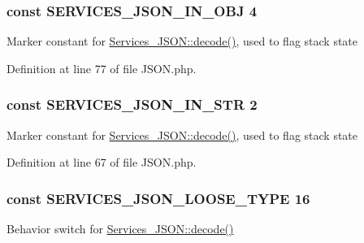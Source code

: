 \hypertarget{_j_s_o_n_8php_a3c58eb6f6956ee76d47965de616827a3}{
\subsubsection[{S\+E\+R\+V\+I\+C\+E\+S\+\_\+\+J\+S\+O\+N\+\_\+\+I\+N\+\_\+\+O\+B\+J}]{\setlength{\rightskip}{0pt plus 5cm}const S\+E\+R\+V\+I\+C\+E\+S\+\_\+\+J\+S\+O\+N\+\_\+\+I\+N\+\_\+\+O\+B\+J 4}}\label{_j_s_o_n_8php_a3c58eb6f6956ee76d47965de616827a3}
Marker constant for \hyperlink{class_services___j_s_o_n_a4afbb486f4a5ff5a8170c832f5997986}{Services\+\_\+\+J\+S\+O\+N\+::decode()}, used to flag stack state 

Definition at line 77 of file J\+S\+O\+N.\+php.

\hypertarget{_j_s_o_n_8php_ab05e1b32faca0c11f3843141c2e89f40}{
\subsubsection[{S\+E\+R\+V\+I\+C\+E\+S\+\_\+\+J\+S\+O\+N\+\_\+\+I\+N\+\_\+\+S\+T\+R}]{\setlength{\rightskip}{0pt plus 5cm}const S\+E\+R\+V\+I\+C\+E\+S\+\_\+\+J\+S\+O\+N\+\_\+\+I\+N\+\_\+\+S\+T\+R 2}}\label{_j_s_o_n_8php_ab05e1b32faca0c11f3843141c2e89f40}
Marker constant for \hyperlink{class_services___j_s_o_n_a4afbb486f4a5ff5a8170c832f5997986}{Services\+\_\+\+J\+S\+O\+N\+::decode()}, used to flag stack state 

Definition at line 67 of file J\+S\+O\+N.\+php.

\hypertarget{_j_s_o_n_8php_a05615b32a21d38e71227831a102e0275}{
\subsubsection[{S\+E\+R\+V\+I\+C\+E\+S\+\_\+\+J\+S\+O\+N\+\_\+\+L\+O\+O\+S\+E\+\_\+\+T\+Y\+P\+E}]{\setlength{\rightskip}{0pt plus 5cm}const S\+E\+R\+V\+I\+C\+E\+S\+\_\+\+J\+S\+O\+N\+\_\+\+L\+O\+O\+S\+E\+\_\+\+T\+Y\+P\+E 16}}\label{_j_s_o_n_8php_a05615b32a21d38e71227831a102e0275}
Behavior switch for \hyperlink{class_services___j_s_o_n_a4afbb486f4a5ff5a8170c832f5997986}{Services\+\_\+\+J\+S\+O\+N\+::decode()} 


